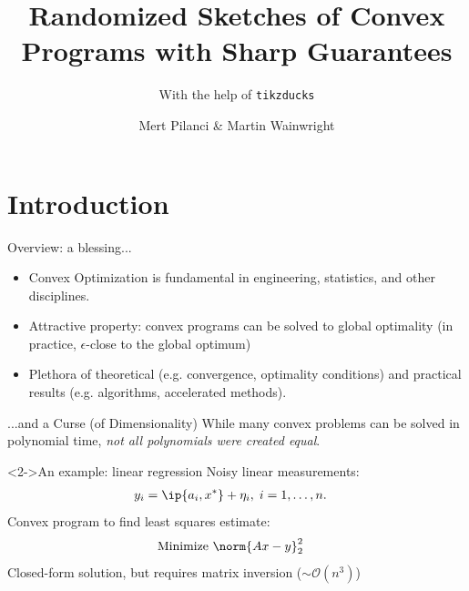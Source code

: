 \documentclass[10pt]{beamer}
\begin{document}
\title{Randomized Sketches of Convex Programs with Sharp Guarantees}
\subtitle{With the help of \texttt{tikzducks}}
\author{Mert Pilanci \& Martin Wainwright}
\frame{\titlepage}
\frame{\tableofcontents}

\section{Introduction}
\begin{frame}{Overview: a blessing...}
    \begin{itemize}
    \item<1-> Convex Optimization is fundamental in engineering,
    statistics, and other disciplines.
    \item<2-> Attractive property: convex programs can be solved to global
    optimality (in practice, $\epsilon$-close to the global optimum)
    \item<3-> Plethora of theoretical (e.g. convergence, optimality conditions)
    and practical results (e.g. algorithms, accelerated methods).
    \end{itemize}
\end{frame}
%
\begin{frame}{...and a Curse (of Dimensionality)}
    While many convex problems can be solved in polynomial time, \textit{not
    all polynomials were created equal}.
    \linebreak
    \begin{block}<2->{An example: linear regression}
        Noisy linear measurements:
        \begin{align*}
            y_i &= \ip{a_i, x^*} + \eta_i, \; i = 1, \dots, n.
        \end{align*}
        Convex program to find least squares estimate:
        \begin{align*}
            \mbox{Minimize } & \norm{Ax - y}_2^2
        \end{align*}
        Closed-form solution, but requires matrix inversion
        ($\sim \mathcal{O}(n^3)$)
    \end{block}
\end{frame}
\end{document}

